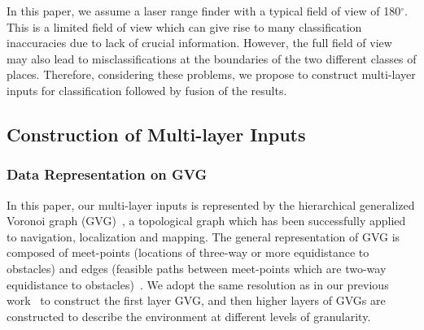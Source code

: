 \documentclass[letterpaper, 10 pt, conference]{ieeeconf}  %
\begin{document}
%
In this paper, we assume a laser range finder with a typical field of view of 180$^\circ$. This is a limited field of view which can give rise to many classification inaccuracies due to lack of crucial information. However, the full field of view may also lead to misclassifications at the boundaries of the two different classes of places.  Therefore, considering these problems, we propose to construct multi-layer inputs for classification followed by fusion of the results.


\subsection{Construction of Multi-layer Inputs}


\subsubsection{Data Representation on GVG}
In this paper, our multi-layer inputs is represented by the hierarchical generalized Voronoi graph (GVG)~\cite{choset1995sensor}, a topological graph which has been successfully applied to navigation, localization and mapping. The general representation of GVG is composed of meet-points (locations of three-way or more equidistance to obstacles) and edges (feasible paths between meet-points which are two-way equidistance to obstacles)~\cite{tao2011incremental}. We adopt the same resolution as in our previous work~\cite{shi2013towards} to construct the first layer GVG, and then higher layers of GVGs are constructed to describe the environment at different levels of granularity.
\end{document}
